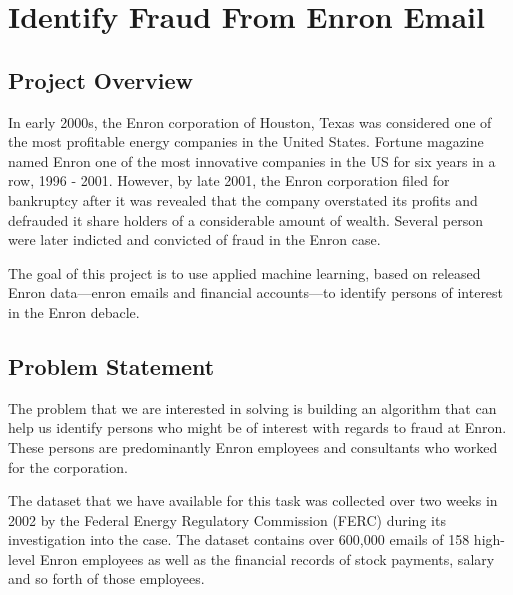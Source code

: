 \documentclass[twoside,openright,titlepage,numbers=noenddot,headinclude,%
               footinclude=true,cleardoublepage=empty,abstractoff,BCOR=5mm,%
               paper=a4,fontsize=11pt,ngerman,american]{scrreprt}
\numberwithin{theorem}{chapter}
\numberwithin{definition}{chapter}
\numberwithin{algorithm}{chapter}
\numberwithin{figure}{chapter}
\numberwithin{table}{chapter}
\numberwithin{equation}{chapter}
\begin{document}
\frenchspacing
\raggedbottom
{}
\pagestyle{plain}






\cleardoublepage


\chapter*{Identify Fraud From Enron Email}



\section*{Project Overview}

In early 2000s, the Enron corporation of Houston, Texas was considered one of the most profitable energy companies in the United States. Fortune magazine named Enron one of the most innovative companies in the US for six years in a row, 1996 - 2001. However, by late 2001, the Enron corporation filed for bankruptcy after it was revealed that the company overstated its profits and defrauded it share holders of a considerable amount of wealth. Several person were later indicted and convicted of fraud in the Enron case. 

The goal of this project is to use applied machine learning, based on released Enron data---enron emails and financial accounts---to identify persons of interest in the Enron debacle.


\section*{Problem Statement}

The problem that we are interested in solving is building an algorithm that can help us identify persons who might be of interest with regards to fraud at Enron. These persons are predominantly Enron employees and consultants who worked for the corporation. 

The dataset that we have available for this task was collected over two weeks in 2002 by the Federal Energy Regulatory Commission (FERC) during its investigation into the case. The dataset contains over 600,000 emails of 158 high-level Enron employees as well as the financial records of stock payments, salary and so forth of those employees.
\end{document}
